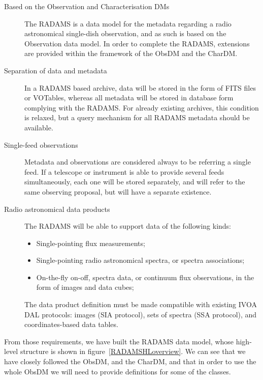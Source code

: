 		\begin{description}
			\item[Based on the Observation and Characterisation DMs]
			The RADAMS is a da\-ta model for the metadata regarding a
			radio astronomical single-dish observation, and as such
			is based on the Observation data model. In order to
			complete the RADAMS, extensions are provided within the
			framework of the ObsDM and the CharDM.
			
			\item[Separation of data and metadata] In a RADAMS
			based archive, data will be stored in the form of FITS
			files or VOTables, whereas all metadata will be stored
			in database form complying with the RADAMS. For already
			existing archives, this condition is relaxed, but a
			query mechanism for all RADAMS metadata should be
			available.
			
			\item[Single-feed observations] Metadata and
			observations are considered always to be referring a
			single feed. If a telescope or instrument is able to
			provide several feeds simultaneously, each one will be
			stored separately, and will refer to the same observing
			proposal, but will have a separate existence.
			
 			\item[Radio astronomical data products] The RADAMS will
 			be able to support data of the following kinds:
			
			\begin{itemize}
				\item Single-pointing flux measurements;
				
				\item Single-pointing radio astronomical spectra,
				or spectra associations;
				
				\item On-the-fly on-off, spectra data, or 
				continuum flux observations, in the form of images
				and data cubes;
			\end{itemize}
			
			The data product definition must be made compatible
			with existing IVOA DAL protocols: images (SIA protocol),
			sets of
			spectra (SSA protocol), and coordinates-based data tables.
			
		\end{description}
		
		From those requirements, we have built the RADAMS data
		model, whose high-level structure is shown in
		figure~\ref{RADAMSHLoverview}. We can see that we have
		closely followed the ObsDM, and the CharDM, and that in
		order to use 
		the whole ObsDM we will need to provide definitions for
		some of the classes.
		
